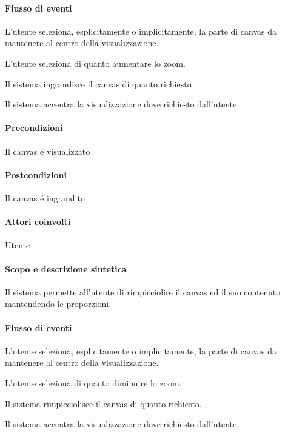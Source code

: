 \paragraph{Flusso di eventi}
\begin{elenconumerato}[\textbf{}]{\subsubsecindent}
\item L'utente seleziona, esplicitamente o implicitamente, la parte di canvas da mantenere al centro della visualizzazione.
\item L'utente seleziona di quanto aumentare lo zoom.
\item Il sistema ingrandisce il canvas di quanto richiesto
\item Il sistema accentra la visualizzazione dove richiesto dall'utente
\end{elenconumerato}
\paragraph{Precondizioni} Il canvas \'e visualizzato
\paragraph{Postcondizioni} Il canvas \'e ingrandito

\paragraph{Attori coinvolti} Utente
\paragraph{Scopo e descrizione sintetica} 
Il sistema permette all'utente di rimpicciolire il canvas ed il suo contenuto mantendendo le proporzioni.
\paragraph{Flusso di eventi}
\begin{elenconumerato}[\textbf{}]{\subsubsecindent}
\item L'utente seleziona, esplicitamente o implicitamente, la parte di canvas da mantenere al centro della visualizzazione.
\item L'utente seleziona di quanto diminuire lo zoom.
\item Il sistema rimpicciolisce il canvas di quanto richiesto.
\item Il sistema accentra la visualizzazione dove richiesto dall'utente.
\end{elenconumerato}
